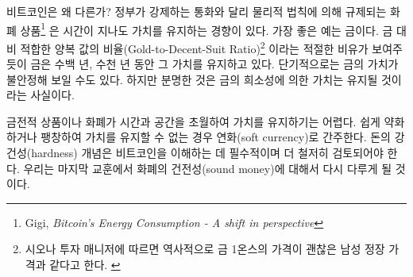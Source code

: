 \begin{comment}
Why is Bitcoin different? In contrast to currencies mandated by the government,
monetary goods which are not regulated by governments, but by the laws of
physics\footnote{Gigi, \textit{Bitcoin's Energy Consumption - A shift in
perspective} \cite{gigi:energy}}, tend to survive and even hold their respective
value over time. The best example of this so far is gold, which, as the
aptly-named \textit{Gold-to-Decent-Suit Ratio}\footnote{History shows that the
price of an ounce of gold equals the price of a decent men's suit, according to Sionna
investment managers \cite{web:gold-to-decent-suite-ratio}} shows, is holding its
value over hundreds and even thousands of years. It might not be perfectly
\enquote{stable} --- a questionable concept in the first place --- but the value it
holds will at least be in the same order of magnitude.
\end{comment}
비트코인은 왜 다른가? 정부가 강제하는 통화와 달리 물리적 법칙에 의해 규제되는 화폐 상품\footnote{Gigi, \textit{Bitcoin's Energy Consumption - A shift in perspective}\cite{gigi:energy}}
은 시간이 지나도 가치를 유지하는 경향이 있다. 가장 좋은 예는 금이다. 
금 대비 적합한 양복 값의 비율(Gold-to-Decent-Suit Ratio)\footnote{시오나 투자 매니저에 따르면 역사적으로 금 1온스의 가격이 괜찮은 남성 정장 가격과 같다고 한다. \cite{web:gold-to-decent-suite-ratio}}
이라는 적절한 비유가 보여주듯이 금은 수백 년, 수천 년 동안 그 가치를 유지하고 있다. 
단기적으로는 금의 가치가 불안정해 보일 수도 있다.
하지만 분명한 것은 금의 희소성에 의한 가치는 유지될 것이라는 사실이다.

\begin{comment}
If a monetary good or currency holds its value well over time and space,
it is considered to be \textit{hard}. If it can't hold its value, because it
easily deteriorates or inflates, it is considered a \textit{soft} currency. The
concept of hardness is essential to understand Bitcoin and is worthy of
a more thorough examination. We will return to it in the last economic
lesson: sound money.
\end{comment}
금전적 상품이나 화폐가 시간과 공간을 초월하여 가치를 유지하기는 어렵다. 
쉽게 약화하거나 팽창하여 가치를 유지할 수 없는 경우 연화(soft currency)로 간주한다. 
돈의 강건성(hardness) 개념은 비트코인을 이해하는 데 필수적이며 더 철저히 검토되어야 한다.
우리는 마지막 교훈에서 화폐의 건전성(sound money)에 대해서 다시 다루게 될 것이다.


